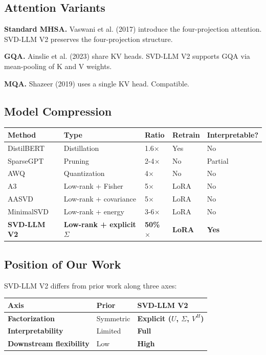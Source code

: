 \subsection{Attention Variants}

\textbf{Standard MHSA.} Vaswani et al. (2017) introduce the four-projection 
attention. SVD-LLM V2 preserves the four-projection structure.

\textbf{GQA.} Ainslie et al. (2023) share KV heads. SVD-LLM V2 supports GQA via 
mean-pooling of K and V weights.

\textbf{MQA.} Shazeer (2019) uses a single KV head. Compatible.

\subsection{Model Compression}

\begin{table}[H]
\centering
\small
\begin{tabular}{lllll}
\toprule
\textbf{Method} & \textbf{Type} & \textbf{Ratio} & \textbf{Retrain} & \textbf{Interpretable?} \\
\midrule
DistilBERT & Distillation & 1.6$\times$ & Yes & No \\
SparseGPT & Pruning & 2-4$\times$ & No & Partial \\
AWQ & Quantization & 4$\times$ & No & No \\
A3 & Low-rank + Fisher & 5$\times$ & LoRA & No \\
AASVD & Low-rank + covariance & 5$\times$ & LoRA & No \\
MinimalSVD & Low-rank + energy & 3-6$\times$ & LoRA & No \\
\textbf{SVD-LLM V2} & \textbf{Low-rank + explicit $\Sigma$} & \textbf{50\%$\times$} & \textbf{LoRA} & \textbf{Yes} \\
\bottomrule
\end{tabular}
\end{table}

\subsection{Position of Our Work}

SVD-LLM V2 differs from prior work along three axes:

\begin{table}[H]
\centering
\small
\begin{tabular}{lll}
\toprule
\textbf{Axis} & \textbf{Prior} & \textbf{SVD-LLM V2} \\
\midrule
\textbf{Factorization} & Symmetric & \textbf{Explicit ($U$, $\Sigma$, $V^H$)} \\
\textbf{Interpretability} & Limited & \textbf{Full} \\
\textbf{Downstream flexibility} & Low & \textbf{High} \\
\bottomrule
\end{tabular}
\end{table}

